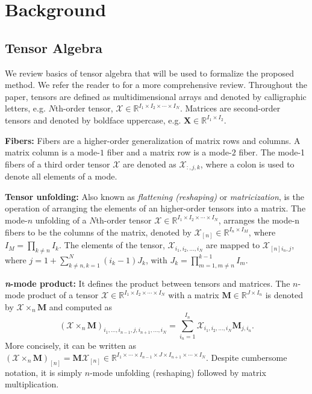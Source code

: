\documentclass{article}
\begin{document}
\vspace{-2mm}
\section{Background}
\label{background}

\vspace{-2mm}
\subsection{Tensor Algebra}
We review basics of tensor algebra that will be used to formalize the proposed method. We refer the reader to \cite{KoBa09} for a more comprehensive review. Throughout the paper, tensors are defined as multidimensional arrays and denoted by calligraphic letters, e.g. $N$th-order tensor, $\mathcal{X} \in \mathbb{R}^{I_1 \times I_2 \times \cdots \times I_N}$. Matrices are second-order tensors and denoted by boldface uppercase, e.g. $\mathbf{X} \in \mathbb{R}^{I_1 \times I_2}$. 


\textbf{Fibers:} Fibers are a higher-order generalization of matrix rows and columns. A matrix column is a mode-$1$ fiber and a matrix row is a mode-$2$ fiber. The mode-1 fibers of a third order tensor $\mathcal{X}$ are denoted as $\mathcal{X}_{:,j,k}$, where a colon is used to denote all elements of a mode.


\textbf{Tensor unfolding:} Also known as \textit{flattening (reshaping)} or \textit{matricization}, is the operation of arranging the elements of an higher-order tensors into a matrix. The mode-$n$ unfolding of a $N$th-order tensor $\mathcal{X} \in \mathbb{R}^{I_1 \times I_2 \times \cdots \times I_N}$, arranges the mode-n fibers to be the columns of the matrix, denoted by $\mathcal{X}_{[n]} \in \mathbb{R}^{I_n \times I_M}$, where $I_M=\prod_{k \neq n} I_k$. The elements of the tensor, $ \mathcal{X}_{i_1,i_2,\dots,i_N}$ are mapped to $\mathcal{X}_{[n]i_n,j}$, where $j = 1 + \sum_{k \neq n, k=1}^{N} (i_k-1)J_k$, with $J_k=\prod_{m=1,m \neq n}^{k-1}I_m$.



\textbf{\textit{n}-mode product:} It defines the product between tensors and matrices. The $n$-mode product of a tensor $\mathcal{X} \in \mathbb{R}^{I_1 \times I_2 \times \cdots \times I_N}$ with a matrix $\mathbf{M} \in \mathbb{R}^{J \times I_n}$ is denoted by $\mathcal{X} \times_n \mathbf{M}$ and computed as
\begin{equation}
(\mathcal{X} \times_n \mathbf{M})_{i_1,\dots,i_{n-1},j,i_{n+1},\dots,i_N} = \sum_{i_n=1}^{I_n} \mathcal{X}_{i_1,i_2,\dots,i_N} \mathbf{M}_{j,i_n} .
\end{equation}
More concisely, it can be written as $(\mathcal{X} \times_n \mathbf{M})_{[n]} = \mathbf{M}\mathcal{X}_{[n]} \in \mathbb{R}^{I_1 \times \cdots \times I_{n-1} \times J \times I_{n+1} \times \cdots \times I_N}$. Despite cumbersome notation, it is simply $n$-mode unfolding (reshaping) followed by matrix multiplication.
\end{document}
